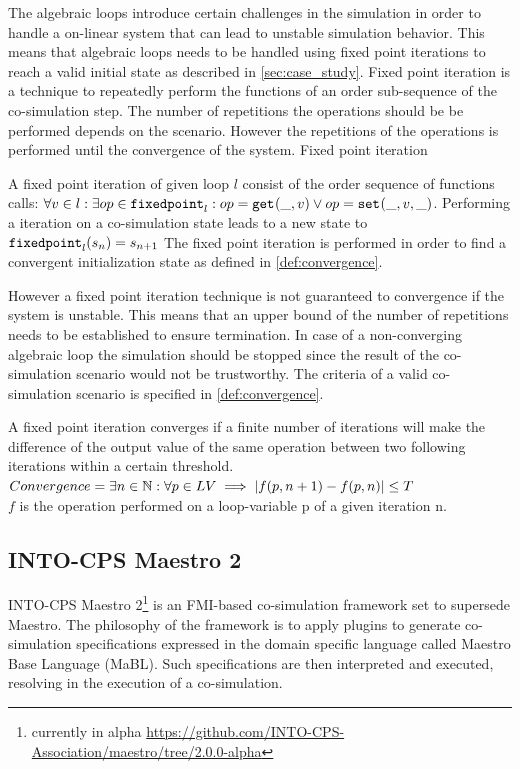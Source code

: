 The algebraic loops introduce certain challenges in the simulation in order to handle a on-linear system that can lead to unstable simulation behavior. This means that algebraic loops needs to be handled using fixed point iterations\cite{Gomes2018} to reach a valid initial state as described in \cref{sec:case_study}. Fixed point iteration is a technique to repeatedly perform the functions of an order sub-sequence of the co-simulation step. The number of repetitions the operations should be be performed depends on the scenario. However the repetitions of the operations is performed until the convergence of the system. Fixed point iteration 


\begin{definition}\label{def:fixedpoint}
A fixed point iteration of given loop $l$ consist of the order sequence of functions calls:
$\forall v \in l: \exists op \in \mathtt{fixedpoint}_{l} : op = \mathtt{get}_{}(\_, v) \lor op = \mathtt{set}_{}(\_, v, \_)$.
Performing a iteration on a co-simulation state leads to a new state to $\mathtt{fixedpoint}_{l}(s_{n}) = s_{n + 1}$
The fixed point iteration is performed in order to find a convergent initialization state as defined in \cref{def:convergence}.
\end{definition}

However a fixed point iteration technique is not guaranteed to convergence if the system is unstable. This means that an upper bound of the number of repetitions needs to be established to ensure termination. In case of a non-converging algebraic loop the simulation should be stopped since the result of the co-simulation scenario would not be trustworthy. The criteria of a valid co-simulation scenario is specified in \cref{def:convergence}.

\begin{definition}\label{def:convergence}
A fixed point iteration converges if a finite number of iterations will make the difference of the output value of the same operation between two following iterations within a certain threshold.\\
$Convergence = \exists n \in \mathbb{N}: \forall p \in LV \implies |f(p, n + 1) - f(p, n)| \leq T$\\
$f$ is the operation performed on a loop-variable p of a given iteration n.
\end{definition}

\subsection{INTO-CPS Maestro 2}
INTO-CPS Maestro 2\footnote{currently in alpha \url{https://github.com/INTO-CPS-Association/maestro/tree/2.0.0-alpha}}\cite{thule_maestro2_2019} is an FMI-based co-simulation framework set to supersede Maestro\cite{Maestro}. The philosophy of the framework is to apply plugins to generate co-simulation specifications expressed in the domain specific language called Maestro Base Language (MaBL). Such specifications are then interpreted and executed, resolving in the execution of a co-simulation.